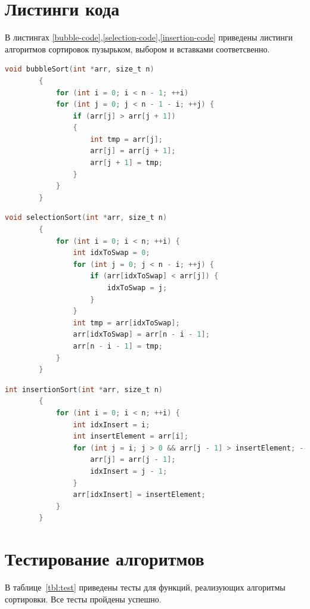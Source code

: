\documentclass[12pt]{report}
\begin{document}
	\section{Листинги кода}
	
	В листингах \ref{bubble-code},\ref{selection-code},\ref{insertion-code} приведены листинги алгоритмов сортировок пузырьком, выбором и вставками соответсвенно.
	
	\begin{lstlisting}[label=bubble-code,caption=Функция сортировки массива пузырьком,language=C]
		void bubbleSort(int *arr, size_t n)
		{
			for (int i = 0; i < n - 1; ++i)
			for (int j = 0; j < n - 1 - i; ++j) {
				if (arr[j] > arr[j + 1])
				{
					int tmp = arr[j];
					arr[j] = arr[j + 1];
					arr[j + 1] = tmp;
				}
			}
		}
	\end{lstlisting}

	
	\begin{lstlisting}[label=selection-code,caption=Функция сортировки массива выбором,language=C]
		void selectionSort(int *arr, size_t n)
		{
			for (int i = 0; i < n; ++i) {
				int idxToSwap = 0;
				for (int j = 0; j < n - i; ++j) {
					if (arr[idxToSwap] < arr[j]) {
						idxToSwap = j;
					}
				}
				int tmp = arr[idxToSwap];
				arr[idxToSwap] = arr[n - i - 1];
				arr[n - i - 1] = tmp;
			}
		}
	\end{lstlisting}

	\begin{lstlisting}[label=insertion-code,caption=Функция сортировки массива вставками,language=C]
		int insertionSort(int *arr, size_t n)
		{
			for (int i = 0; i < n; ++i) {
				int idxInsert = i;
				int insertElement = arr[i];
				for (int j = i; j > 0 && arr[j - 1] > insertElement; --j) {
					arr[j] = arr[j - 1];
					idxInsert = j - 1;
				}
				arr[idxInsert] = insertElement;
			}
		}
	\end{lstlisting}

	\section{Тестирование алгоритмов}

	В таблице~\ref{tbl:test} приведены тесты для функций, реализующих алгоритмы сортировки. Все тесты пройдены успешно.
	
\end{document}
